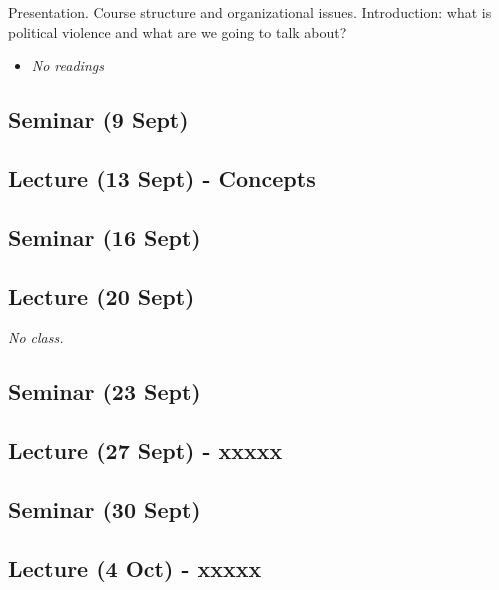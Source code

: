 \documentclass[12pt, a4paper]{article}
\begin{document}
Presentation. Course structure and organizational issues. Introduction: what is political violence and what are we going to talk about?

\begin{itemize}
\setlength\itemsep{-5pt}
\item \textit{No readings}
\end{itemize}

\subsection*{Seminar (9 Sept) {\color{red}{(No class)}}}

\subsection*{Lecture (13 Sept) - Concepts}

\subsection*{Seminar (16 Sept)}

\subsection*{Lecture (20 Sept) {\color{red}{(No class)}}}

\textit{No class.}

\subsection*{Seminar (23 Sept)}

\subsection*{Lecture (27 Sept) - xxxxx}

\subsection*{Seminar (30 Sept)}

\subsection*{Lecture (4 Oct) - xxxxx}
\end{document}
